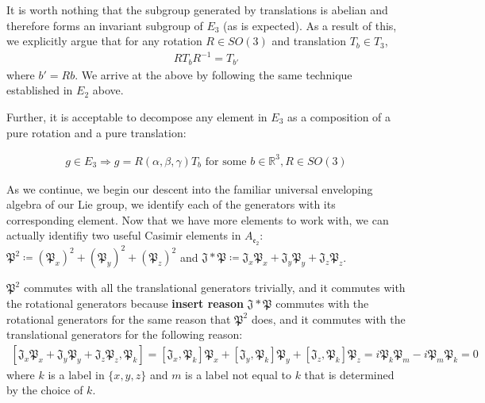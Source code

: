 \documentclass[10pt]{ucthesis}
\newcommand{\R}{\mathbb{R}}
\begin{document}
It is worth nothing that the subgroup generated by translations is abelian and therefore forms an invariant subgroup of $E_3$ (as is expected). As a result of this, we explicitly argue that for any rotation $R\in SO(3)$ and translation $T_b\in T_3$,
\begin{equation}
\begin{aligned}
	RT_bR^{-1} = T_{b'}
\end{aligned}
\end{equation}
where $b' = Rb$. We arrive at the above by following the same technique established in $E_2$ above.

Further, it is acceptable to decompose any element in $E_3$ as a composition of a pure rotation and a pure translation:

\begin{equation}
\begin{aligned}
	g\in E_3 \Rightarrow g = R(\alpha,\beta,\gamma)T_b\text{ for some } b\in\R^3, R\in SO(3)
\end{aligned}
\end{equation}

As we continue, we begin our descent into the familiar universal enveloping algebra of our Lie group, we identify each of the generators with its corresponding element. Now that we have more elements to work with, we can actually identifiy two useful Casimir elements in $A_\mathfrak{e_2}$: $\mathfrak{P^2}\coloneq (\mathfrak{P}_x)^2 + (\mathfrak{P}_y)^2 + (\mathfrak{P}_z)^2$ and $\mathfrak{J}* \mathfrak{P} \coloneq \mathfrak{J}_x\mathfrak{P}_x +\mathfrak{J}_y\mathfrak{P}_y + \mathfrak{J}_z\mathfrak{P}_z$.

$\mathfrak{P^2}$ commutes with all the translational generators trivially, and it commutes with the rotational generators because \textbf{insert reason}
$\mathfrak{J}*\mathfrak{P}$ commutes with the rotational generators for the same reason that $\mathfrak{P}^2$ does, and it commutes with the translational generators for the following reason:
\begin{equation}
\begin{aligned}
 [\mathfrak{J}_x\mathfrak{P}_x+\mathfrak{J}_y\mathfrak{P}_y+\mathfrak{J}_z\mathfrak{P}_z, \mathfrak{P}_k] = [\mathfrak{J}_x,\mathfrak{P}_k]\mathfrak{P}_x + [\mathfrak{J}_y,\mathfrak{P}_k]\mathfrak{P}_y + [\mathfrak{J}_z,\mathfrak{P}_k]\mathfrak{P}_z = i\mathfrak{P}_k\mathfrak{P}_m-i\mathfrak{P}_m\mathfrak{P}_k = 0
\end{aligned}
\end{equation}
where $k$ is a label in $\{x,y,z\}$ and $m$ is a label not equal to $k$ that is determined by the choice of $k$.
\end{document}
